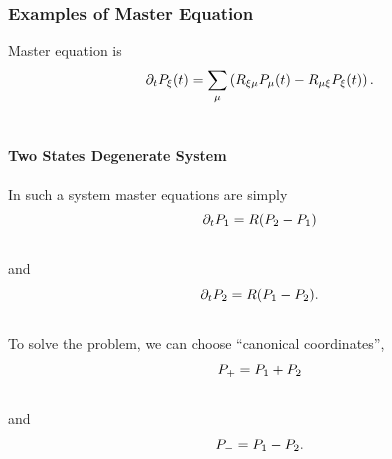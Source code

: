 \documentclass[letterpaper,10pt,english]{sphinxmanual}
\begin{document}
\subsubsection{Examples of Master Equation}
\label{nonequilibrium/week9:examples-of-master-equation}
Master equation is
\begin{gather}
\begin{split}\partial_t P_\xi(t) = \sum_\mu \left( R_{\xi\mu}P_\mu(t) - R_{\mu\xi}P_\xi(t) \right) .\end{split}\notag\\\begin{split}\end{split}\notag
\end{gather}

\paragraph{Two States Degenerate System}
\label{nonequilibrium/week9:two-states-degenerate-system}
In such a system master equations are simply
\begin{gather}
\begin{split}\partial_t P_1 = R (P_2 - P_1)\end{split}\notag\\\begin{split}\end{split}\notag
\end{gather}
and
\begin{gather}
\begin{split}\partial_t P_2 = R (P_1 - P_2) .\end{split}\notag\\\begin{split}\end{split}\notag
\end{gather}
To solve the problem, we can choose ``canonical coordinates'',
\begin{gather}
\begin{split}P_+ = P_1+P_2\end{split}\notag\\\begin{split}\end{split}\notag
\end{gather}
and
\begin{gather}
\begin{split}P_- = P_1 - P_2 .\end{split}\notag\\\begin{split}\end{split}\notag
\end{gather}
\end{document}
